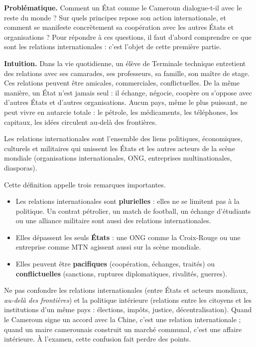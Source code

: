 \documentclass[11pt]{article}
\newcommand{\cle}[1]{{\popxbold\color{popdark}#1}}
\newcounter{popsec}
\newcounter{popsub}
\newcommand{\courssub}[1]{%
  \stepcounter{popsub}%
  \par\vspace{9pt}\noindent{\popxbold\fontsize{11.5}{13}\selectfont\color{popink}{\color{poporange}\thepopsec.\thepopsub}\hspace{6pt}#1}\par\nopagebreak\vspace{4pt}
}
\begin{document}
\textbf{Problématique.} Comment un État comme le Cameroun dialogue-t-il avec le reste du monde ? Sur quels principes repose son action internationale, et comment se manifeste concrètement sa coopération avec les autres États et organisations ? Pour répondre à ces questions, il faut d'abord comprendre ce que sont les relations internationales : c'est l'objet de cette première partie.

\courssub{Définition des relations internationales}

\textbf{Intuition.} Dans la vie quotidienne, un élève de Terminale technique entretient des relations avec ses camarades, ses professeurs, sa famille, son maître de stage. Ces relations peuvent être amicales, commerciales, conflictuelles. De la même manière, un État n'est jamais seul : il échange, négocie, coopère ou s'oppose avec d'autres États et d'autres organisations. Aucun pays, même le plus puissant, ne peut vivre en autarcie totale : le pétrole, les médicaments, les téléphones, les capitaux, les idées circulent au-delà des frontières.

\begin{definition}
Les \cle{relations internationales} sont l'ensemble des liens \cle{politiques}, \cle{économiques}, \cle{culturels} et \cle{militaires} qui unissent les \cle{États} et les autres \cle{acteurs de la scène mondiale} (organisations internationales, ONG, entreprises multinationales, diasporas).
\end{definition}

Cette définition appelle trois remarques importantes.

\begin{itemize}
\item Les relations internationales sont \textbf{plurielles} : elles ne se limitent pas à la politique. Un contrat pétrolier, un match de football, un échange d'étudiants ou une alliance militaire sont aussi des relations internationales.
\item Elles dépassent les seuls \textbf{États} : une ONG comme la Croix-Rouge ou une entreprise comme MTN agissent aussi sur la scène mondiale.
\item Elles peuvent être \textbf{pacifiques} (coopération, échanges, traités) ou \textbf{conflictuelles} (sanctions, ruptures diplomatiques, rivalités, guerres).
\end{itemize}

\begin{attention}
Ne pas confondre les \cle{relations internationales} (entre États et acteurs mondiaux, \emph{au-delà des frontières}) et la \cle{politique intérieure} (relations entre les citoyens et les institutions d'un même pays : élections, impôts, justice, décentralisation). Quand le Cameroun signe un accord avec la Chine, c'est une relation internationale ; quand un maire camerounais construit un marché communal, c'est une affaire intérieure. À l'examen, cette confusion fait perdre des points.
\end{attention}
\end{document}
